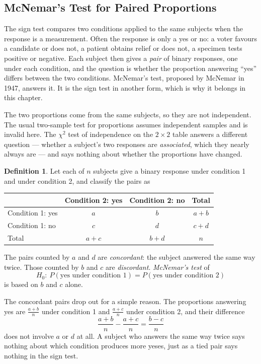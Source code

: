 \documentclass[11pt,a4paper]{article}
\theoremstyle{definition}
\newtheorem{definition}[thm]{Definition}
\begin{document}
\subsection{McNemar's Test for Paired Proportions}
\label{sec:mcnemar}

The sign test compares two conditions applied to the same subjects when the response
is a measurement. Often the response is only a yes or no: a voter favours a candidate
or does not, a patient obtains relief or does not, a specimen tests positive or
negative. Each subject then gives a \emph{pair} of binary responses, one under each
condition, and the question is whether the proportion answering ``yes'' differs between
the two conditions. McNemar's test, proposed by McNemar in 1947, answers it. It is the
sign test in another form, which is why it belongs in this chapter.

The two proportions come from the same subjects, so they are not independent. The
usual two-sample test for proportions assumes independent samples and is invalid here.
The $\chi^{2}$ test of independence on the $2\times 2$ table answers a different
question --- whether a subject's two responses are \emph{associated}, which they nearly
always are --- and says nothing about whether the proportions have changed.

\begin{definition}
Let each of $n$ subjects give a binary response under condition 1 and under
condition 2, and classify the pairs as
\begin{center}
\begin{tabular}{l|cc|c}
 & Condition 2: yes & Condition 2: no & Total\\\hline
Condition 1: yes & $a$ & $b$ & $a+b$\\
Condition 1: no & $c$ & $d$ & $c+d$\\\hline
Total & $a+c$ & $b+d$ & $n$
\end{tabular}
\end{center}
The pairs counted by $a$ and $d$ are \emph{concordant}: the subject answered the same
way twice. Those counted by $b$ and $c$ are \emph{discordant}. \emph{McNemar's test} of
\[H_0:\ P(\text{yes under condition 1}) = P(\text{yes under condition 2})\]
is based on $b$ and $c$ alone.
\end{definition}

The concordant pairs drop out for a simple reason. The proportions answering yes are
$\frac{a+b}{n}$ under condition 1 and $\frac{a+c}{n}$ under condition 2, and their
difference
\[\frac{a+b}{n}-\frac{a+c}{n} = \frac{b-c}{n}\]
does not involve $a$ or $d$ at all. A subject who answers the same way twice says
nothing about which condition produces more yeses, just as a tied pair says nothing in
the sign test.
\end{document}
